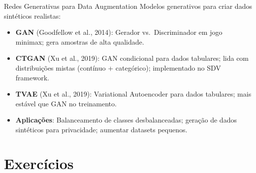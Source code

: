\documentclass[12pt,a4paper]{article}
\begin{document}
\begin{estadoartebox}{Redes Generativas para Data Augmentation}
Modelos generativos para criar dados sintéticos realistas:
\begin{itemize}
  \item \textbf{GAN} (Goodfellow et al., 2014): Gerador vs.\ Discriminador em jogo minimax; gera amostras de alta qualidade.
  \item \textbf{CTGAN} (Xu et al., 2019): GAN condicional para dados tabulares; lida com distribuições mistas (contínuo + categórico); implementado no SDV framework.
  \item \textbf{TVAE} (Xu et al., 2019): Variational Autoencoder para dados tabulares; mais estável que GAN no treinamento.
  \item \textbf{Aplicações}: Balanceamento de classes desbalanceadas; geração de dados sintéticos para privacidade; aumentar datasets pequenos.
\end{itemize}
\end{estadoartebox}

\section{Exercícios}
\end{document}
